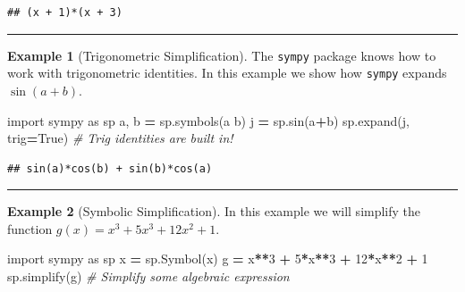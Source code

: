 \documentclass[
]{book}
\newenvironment{Shaded}{\begin{snugshade}}{\end{snugshade}}
\newcommand{\CommentTok}[1]{\textcolor[rgb]{0.56,0.35,0.01}{\textit{#1}}}
\newcommand{\DecValTok}[1]{\textcolor[rgb]{0.00,0.00,0.81}{#1}}
\newcommand{\ImportTok}[1]{#1}
\newcommand{\NormalTok}[1]{#1}
\newcommand{\OperatorTok}[1]{\textcolor[rgb]{0.81,0.36,0.00}{\textbf{#1}}}
\newcommand{\StringTok}[1]{\textcolor[rgb]{0.31,0.60,0.02}{#1}}
\newcommand{\VariableTok}[1]{\textcolor[rgb]{0.00,0.00,0.00}{#1}}
\theoremstyle{definition}
\theoremstyle{definition}
\newtheorem{example}{Example}[chapter]
\theoremstyle{definition}
\theoremstyle{remark}
\begin{document}
\begin{verbatim}
## (x + 1)*(x + 3)
\end{verbatim}

\begin{center}\rule{0.5\linewidth}{0.5pt}\end{center}

\begin{example}[Trigonometric Simplification]
\protect\hypertarget{exm:unnamed-chunk-783}{}{\label{exm:unnamed-chunk-783} {} }The \texttt{sympy} package knows how to work with trigonometric identities. In this example we show how \texttt{sympy} expands \(\sin(a+b)\).
\end{example}

\begin{Shaded}
\begin{Highlighting}[]
\ImportTok{import}\NormalTok{ sympy }\ImportTok{as}\NormalTok{ sp}
\NormalTok{a, b }\OperatorTok{=}\NormalTok{ sp.symbols(}\StringTok{\textquotesingle{}a b\textquotesingle{}}\NormalTok{)}
\NormalTok{j }\OperatorTok{=}\NormalTok{ sp.sin(a}\OperatorTok{+}\NormalTok{b)}
\NormalTok{sp.expand(j, trig}\OperatorTok{=}\VariableTok{True}\NormalTok{) }\CommentTok{\# Trig identities are built in!}
\end{Highlighting}
\end{Shaded}

\begin{verbatim}
## sin(a)*cos(b) + sin(b)*cos(a)
\end{verbatim}

\begin{center}\rule{0.5\linewidth}{0.5pt}\end{center}

\begin{example}[Symbolic Simplification]
\protect\hypertarget{exm:unnamed-chunk-785}{}{\label{exm:unnamed-chunk-785} {} }In this example we will simplify the function \(g(x) = x^3 + 5x^3 + 12x^2 +1\).
\end{example}

\begin{Shaded}
\begin{Highlighting}[]
\ImportTok{import}\NormalTok{ sympy }\ImportTok{as}\NormalTok{ sp}
\NormalTok{x }\OperatorTok{=}\NormalTok{ sp.Symbol(}\StringTok{\textquotesingle{}x\textquotesingle{}}\NormalTok{)}
\NormalTok{g }\OperatorTok{=}\NormalTok{ x}\OperatorTok{**}\DecValTok{3} \OperatorTok{+} \DecValTok{5}\OperatorTok{*}\NormalTok{x}\OperatorTok{**}\DecValTok{3} \OperatorTok{+} \DecValTok{12}\OperatorTok{*}\NormalTok{x}\OperatorTok{**}\DecValTok{2} \OperatorTok{+} \DecValTok{1}
\NormalTok{sp.simplify(g) }\CommentTok{\# Simplify some algebraic expression}
\end{Highlighting}
\end{Shaded}
\end{document}
